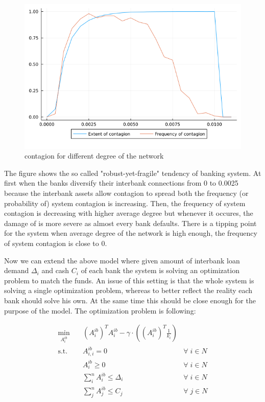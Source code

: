 \documentclass{article}
\begin{document}
\begin{figure}[h]
    \centering
    \includegraphics[scale=0.6]{contagionplot.png}
    \caption{contagion for different degree of the network}
\end{figure}

The figure shows the so called "robust-yet-fragile" tendency of banking system. At first when the banks diversify their interbank connections from 0 to 0.0025 because the interbank assets allow contagion to spread both the frequency (or probability of) system contagion is increasing. Then, the frequency of system contagion is decreasing with higher average degree but whenever it occures, the damage of is more severe as almost every bank defaults. There is a tipping point for the system when average degree of the network is high enough, the frequency of system contagion is close to 0.

Now we can extend the above model where given amount of interbank loan demand $\Delta_i$ and cash $C_i$ of each bank the system is solving an optimization problem to match the funds. An issue of this setting is that the whole system is solving a single optimization problem, whereas to better reflect the reality each bank should solve his own. At the same time this should be close enough for the purpose of the model. The optimization problem is following:

\begin{equation}
    \begin{aligned}
    \min_{A^{ib}_i} \quad & (A^{ib}_i)^T A^{ib}_i - \gamma \cdot \left((A^{ib}_i)^T \frac{1}{k_i}\right)\\
    \textrm{s.t.} \quad & A^{ib}_{i,i} = 0 & \forall \; i \in N\\
      & A^{ib}_i \geq 0 & \forall \; i \in N\\
      & \sum_i^n A^{ib}_i \leq \Delta_i & \forall \; i \in N\\
      & \sum_j^n A^{ib}_j \leq C_j & \forall \; j \in N\\ 
    \end{aligned}
\end{equation}
\end{document}
